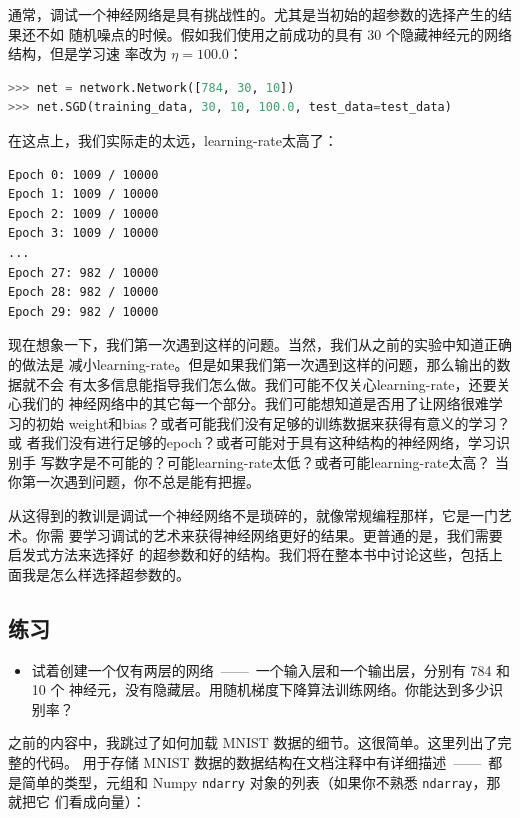 通常，调试一个神经网络是具有挑战性的。尤其是当初始的超参数的选择产生的结果还不如
随机噪点的时候。假如我们使用之前成功的具有 30 个隐藏神经元的网络结构，但是学习速
率改为 $\eta = 100.0$：

\begin{lstlisting}[language=Python]
>>> net = network.Network([784, 30, 10])
>>> net.SGD(training_data, 30, 10, 100.0, test_data=test_data)
\end{lstlisting}

在这点上，我们实际走的太远，\gls*{learning-rate}太高了：

\begin{lstlisting}[language=sh]
Epoch 0: 1009 / 10000
Epoch 1: 1009 / 10000
Epoch 2: 1009 / 10000
Epoch 3: 1009 / 10000
...
Epoch 27: 982 / 10000
Epoch 28: 982 / 10000
Epoch 29: 982 / 10000
\end{lstlisting}

现在想象一下，我们第一次遇到这样的问题。当然，我们从之前的实验中知道正确的做法是
减小\gls*{learning-rate}。但是如果我们第一次遇到这样的问题，那么输出的数据就不会
有太多信息能指导我们怎么做。我们可能不仅关心\gls*{learning-rate}，还要关心我们的
神经网络中的其它每一个部分。我们可能想知道是否用了让网络很难学习的初始%
\gls*{weight}和\gls*{bias}？或者可能我们没有足够的训练数据来获得有意义的学习？或
者我们没有进行足够的\gls*{epoch}？或者可能对于具有这种结构的神经网络，学习识别手
写数字是不可能的？可能\gls*{learning-rate}太低？或者可能\gls*{learning-rate}太高？
当你第一次遇到问题，你不总是能有把握。

从这得到的教训是调试一个神经网络不是琐碎的，就像常规编程那样，它是一门艺术。你需
要学习调试的艺术来获得神经网络更好的结果。更普通的是，我们需要启发式方法来选择好
的超参数和好的结构。我们将在整本书中讨论这些，包括上面我是怎么样选择超参数的。

\subsection*{练习}

\begin{itemize}
\item 试着创建一个仅有两层的网络~——~一个输入层和一个输出层，分别有 784 和 10 个
  神经元，没有隐藏层。用随机梯度下降算法训练网络。你能达到多少识别率？
\end{itemize}

之前的内容中，我跳过了如何加载 MNIST 数据的细节。这很简单。这里列出了完整的代码。
用于存储 MNIST 数据的数据结构在文档注释中有详细描述~——~都是简单的类型，元组和
Numpy \lstinline!ndarry! 对象的列表（如果你不熟悉 \lstinline!ndarray!，那就把它
  们看成向量）：

